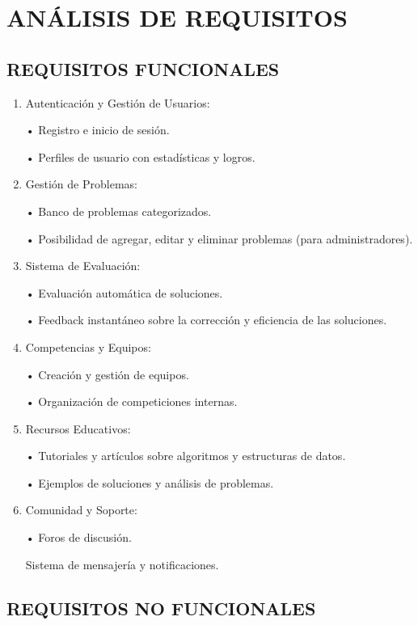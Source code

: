 \section{ANÁLISIS DE REQUISITOS}

\subsection{REQUISITOS FUNCIONALES}

\begin{enumerate}
    \item Autenticación y Gestión de Usuarios:

    •	Registro e inicio de sesión.
    
    •	Perfiles de usuario con estadísticas y logros.
    \item Gestión de Problemas:

    •	Banco de problemas categorizados.
    
    •	Posibilidad de agregar, editar y eliminar problemas (para administradores).
    \item Sistema de Evaluación:

    •	Evaluación automática de soluciones.
    
    •	Feedback instantáneo sobre la corrección y eficiencia de las soluciones.
    \item Competencias y Equipos:
    
    •	Creación y gestión de equipos.
    
    •	Organización de competiciones internas.

    \item Recursos Educativos:
    
    •	Tutoriales y artículos sobre algoritmos y estructuras de datos.
    
    •	Ejemplos de soluciones y análisis de problemas.
    \item Comunidad y Soporte:
    
    •	Foros de discusión.
    
    Sistema de mensajería y notificaciones.
\end{enumerate}

\subsection{REQUISITOS NO FUNCIONALES}

